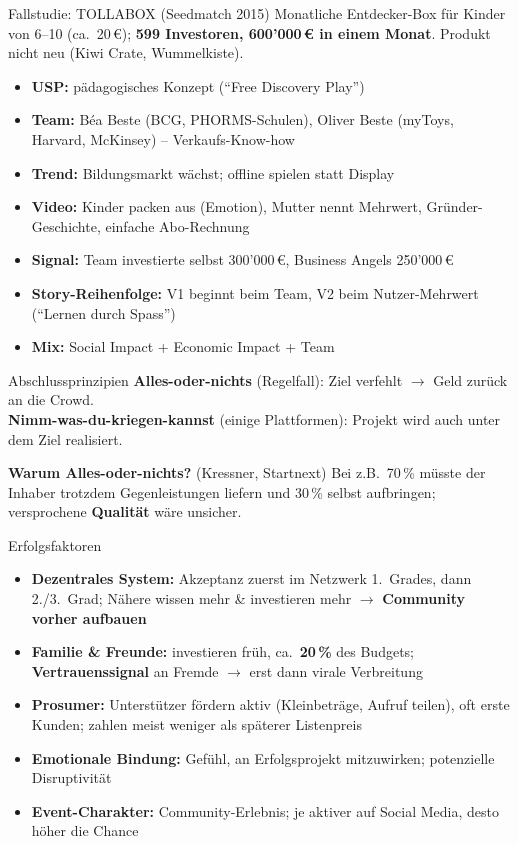 \documentclass[a4paper, fontsize=7pt]{scrartcl}
\begin{document}
\begin{subbox}{Fallstudie: TOLLABOX (Seedmatch 2015)}
Monatliche Entdecker-Box für Kinder von 6--10 (ca.\ 20\,€);
\textbf{599 Investoren, 600'000\,€ in einem Monat}. Produkt nicht neu (Kiwi
Crate, Wummelkiste).
\begin{itemize}
    \item \textbf{USP:} pädagogisches Konzept (``Free Discovery Play'')
    \item \textbf{Team:} Béa Beste (BCG, PHORMS-Schulen), Oliver Beste
    (myToys, Harvard, McKinsey) -- Verkaufs-Know-how
    \item \textbf{Trend:} Bildungsmarkt wächst; offline spielen statt Display
    \item \textbf{Video:} Kinder packen aus (Emotion), Mutter nennt Mehrwert,
    Gründer-Geschichte, einfache Abo-Rechnung
    \item \textbf{Signal:} Team investierte selbst 300'000\,€, Business Angels
    250'000\,€
    \item \textbf{Story-Reihenfolge:} V1 beginnt beim Team, V2 beim
    Nutzer-Mehrwert (``Lernen durch Spass'')
    \item \textbf{Mix:} Social Impact + Economic Impact + Team
\end{itemize}
\end{subbox}

\begin{mainbox}{Abschlussprinzipien}
\textbf{Alles-oder-nichts} (Regelfall): Ziel verfehlt $\to$ Geld zurück an die
Crowd.\\
\textbf{Nimm-was-du-kriegen-kannst} (einige Plattformen): Projekt wird auch
unter dem Ziel realisiert.

\textbf{Warum Alles-oder-nichts?} (Kressner, Startnext) Bei z.B.\ 70\,\%
müsste der Inhaber trotzdem Gegenleistungen liefern und 30\,\% selbst
aufbringen; versprochene \textbf{Qualität} wäre unsicher.
\end{mainbox}

\begin{mainbox}{Erfolgsfaktoren}
\begin{itemize}
    \item \textbf{Dezentrales System:} Akzeptanz zuerst im Netzwerk 1.\ Grades,
    dann 2./3.\ Grad; Nähere wissen mehr \& investieren mehr $\to$
    \textbf{Community vorher aufbauen}
    \item \textbf{Familie \& Freunde:} investieren früh, ca.\ \textbf{20\,\%}
    des Budgets; \textbf{Vertrauenssignal} an Fremde $\to$ erst dann virale
    Verbreitung
    \item \textbf{Prosumer:} Unterstützer fördern aktiv (Kleinbeträge, Aufruf
    teilen), oft erste Kunden; zahlen meist weniger als späterer Listenpreis
    \item \textbf{Emotionale Bindung:} Gefühl, an Erfolgsprojekt mitzuwirken;
    potenzielle Disruptivität
    \item \textbf{Event-Charakter:} Community-Erlebnis; je aktiver auf Social
    Media, desto höher die Chance
\end{itemize}
\end{mainbox}
\end{document}
